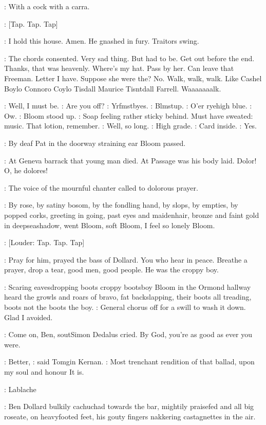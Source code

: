 \BloomInt:
With a cock with a carra.

\Stripling:
[Tap. Tap. Tap]

\BloomInt:
I hold this house. Amen.
He gnashed in fury. Traitors swing.

\BloomInt:
The chords consented. Very sad thing. But had to be. Get out before
the end. Thanks, that was heavenly. Where's my hat. Pass by her. Can
leave that Freeman. Letter I have. Suppose she were the? No. Walk,
walk, walk. Like Cashel Boylo Connoro Coylo Tisdall Maurice Tisntdall
Farrell. Waaaaaaalk.

\BloomInt:
Well, I must be.
\Goulding:
Are you off?
\BloomInt:
Yrfmstbyes.
\BloomInt:
Blmstup.
\Goulding:
O'er ryehigh blue.
\BloomInt:
Ow.
:
Bloom stood up.
\BloomInt:
Soap feeling rather sticky behind. Must have
sweated: music. That lotion, remember.
\BloomInt:
Well, so long.
\Goulding:
High grade.
\BloomInt:
Card inside.
\Goulding:
Yes.

:
By deaf Pat in the doorway
straining ear Bloom passed.

\BloomInt:
At Geneva barrack that young man died. At Passage was his body
laid. Dolor! O, he dolores!

:
The voice of the mournful chanter called to
dolorous prayer.

:
By rose, by satiny bosom, by the fondling hand, by slops, by empties,
by popped corks, greeting in going, past eyes and maidenhair, bronze and
faint gold in deepseashadow, went Bloom, soft Bloom, I feel so lonely
Bloom.

\Stripling:
[Louder: Tap. Tap. Tap]

:
Pray for him, prayed the bass of Dollard. You who hear in peace. Breathe
a prayer, drop a tear, good men, good people.
He was the croppy boy.

:
Scaring eavesdropping boots croppy bootsboy Bloom in the Ormond
hallway heard the growls and roars of bravo, fat backslapping, their boots
all treading, boots not the boots the boy.
\BloomInt:
General chorus off for a swill
to wash it down. Glad I avoided.

\Simon:
Come on, Ben,
sout{Simon Dedalus cried.}
By God, you're as good as ever you were.

\Kernan:
Better,
:
said Tomgin Kernan.
\Kernan:
Most trenchant rendition of that ballad,
upon my soul and honour It is.

\Cowley:
Lablache

:
Ben Dollard bulkily cachuchad towards the bar, mightily praisefed and all
big roseate, on heavyfooted feet, his gouty fingers nakkering castagnettes
in the air.

